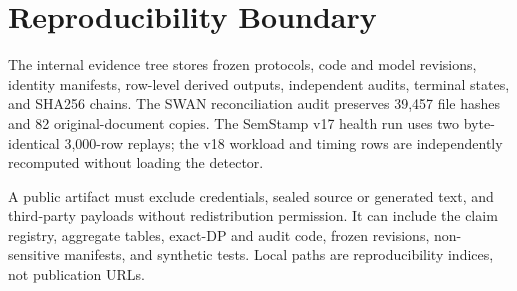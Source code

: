 \documentclass[10pt]{article}
\begin{document}
\section{Reproducibility Boundary}

The internal evidence tree stores frozen protocols, code and model revisions,
identity manifests, row-level derived outputs, independent audits, terminal
states, and SHA256 chains. The SWAN reconciliation audit preserves 39,457
file hashes and 82 original-document copies. The SemStamp v17 health run uses
two byte-identical 3,000-row replays; the v18 workload and timing rows are
independently recomputed without loading the detector.

A public artifact must exclude credentials, sealed source or generated text,
and third-party payloads without redistribution permission. It can include
the claim registry, aggregate tables, exact-DP and audit code, frozen
revisions, non-sensitive manifests, and synthetic tests. Local paths are
reproducibility indices, not publication URLs.
\end{document}
